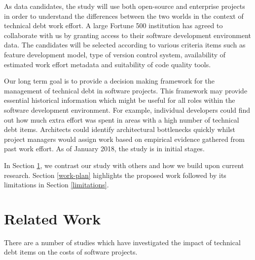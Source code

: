 As data candidates, the study will use both open-source and enterprise projects
in order to understand the differences between the two worlds in the context of
technical debt work effort. A large Fortune 500 institution has agreed to
collaborate with us by granting access to their software development environment
data. The candidates will be selected according to various criteria items such
as feature development model, type of version control system, availability of
estimated work effort metadata and suitability of code quality tools. 

Our long term goal is to provide a decision making framework for the management of
technical debt in software projects. This framework may provide essential
historical information which might be useful for all roles within the software
development environment. For example, individual developers could find out how
much extra effort was spent in areas with a high number of technical debt items.
Architects could identify architectural bottlenecks quickly whilst project
managers would assign work based on empirical evidence gathered from past work
effort. As of January 2018, the study is in initial stages.

In Section \ref{related-work}, we contrast our study with others and how we
build upon current research. Section \ref{work-plan} highlights the proposed
work followed by its limitations in Section \ref{limitations}.  

\section{Related Work}
\label{related-work}

There are a number of studies which have investigated the impact of technical
debt items on the costs of software projects. 

